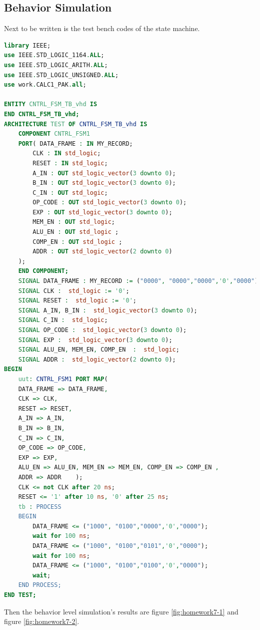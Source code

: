 \documentclass{article}
\begin{document}
    \subsection{Behavior Simulation}
    
    Next to be written is the test bench codes of the state machine.
    \begin{lstlisting}[language=VHDL,caption=Test Bench of State Machine]
library IEEE;
use IEEE.STD_LOGIC_1164.ALL;
use IEEE.STD_LOGIC_ARITH.ALL;
use IEEE.STD_LOGIC_UNSIGNED.ALL;
use work.CALC1_PAK.all;

ENTITY CNTRL_FSM_TB_vhd IS
END CNTRL_FSM_TB_vhd;
ARCHITECTURE TEST OF CNTRL_FSM_TB_vhd IS 
    COMPONENT CNTRL_FSM1
    PORT( DATA_FRAME : IN MY_RECORD;
        CLK : IN std_logic;
        RESET : IN std_logic;          
        A_IN : OUT std_logic_vector(3 downto 0);
        B_IN : OUT std_logic_vector(3 downto 0);
        C_IN : OUT std_logic;
        OP_CODE : OUT std_logic_vector(3 downto 0);
        EXP : OUT std_logic_vector(3 downto 0);
        MEM_EN : OUT std_logic;
        ALU_EN : OUT std_logic ;
        COMP_EN : OUT std_logic ;
        ADDR : OUT std_logic_vector(2 downto 0)
    );
    END COMPONENT;
    SIGNAL DATA_FRAME : MY_RECORD := ("0000", "0000","0000",'0',"0000");
    SIGNAL CLK :  std_logic := '0';
    SIGNAL RESET :  std_logic := '0';
    SIGNAL A_IN, B_IN :  std_logic_vector(3 downto 0);	 
    SIGNAL C_IN :  std_logic;
    SIGNAL OP_CODE :  std_logic_vector(3 downto 0);
    SIGNAL EXP :  std_logic_vector(3 downto 0);
    SIGNAL ALU_EN, MEM_EN, COMP_EN  :  std_logic;
    SIGNAL ADDR :  std_logic_vector(2 downto 0);
BEGIN
    uut: CNTRL_FSM1 PORT MAP(
    DATA_FRAME => DATA_FRAME,
    CLK => CLK,
    RESET => RESET,
    A_IN => A_IN,
    B_IN => B_IN,
    C_IN => C_IN,
    OP_CODE => OP_CODE,
    EXP => EXP,
    ALU_EN => ALU_EN, MEM_EN => MEM_EN, COMP_EN => COMP_EN ,
    ADDR => ADDR	);
    CLK <= not CLK after 20 ns;
    RESET <= '1' after 10 ns, '0' after 25 ns;    
    tb : PROCESS
    BEGIN
        DATA_FRAME <= ("1000", "0100","0000",'0',"0000");		 
        wait for 100 ns;
        DATA_FRAME <= ("1000", "0100","0101",'0',"0000");		 
        wait for 100 ns;
        DATA_FRAME <= ("1000", "0100","0100",'0',"0000");
        wait;
    END PROCESS;
END TEST;
    \end{lstlisting}
    
    Then the behavior level simulation's results are figure \ref{fig:homework7-1} and figure \ref{fig:homework7-2}.
    
\end{document}
